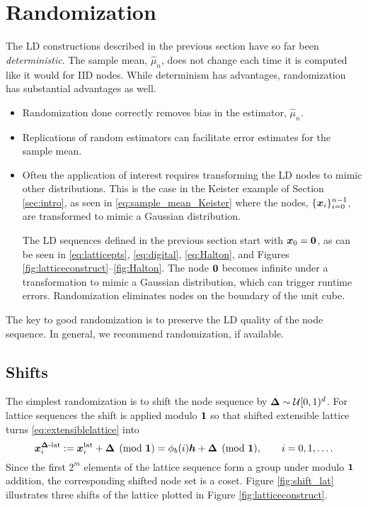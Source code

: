 \documentclass{svproc}
\begin{document}
\section{Randomization} \label{sec:random}
The LD constructions described in the previous section have so far been \emph{deterministic}. The sample mean, $\hat{\mu}_n$, does not change each time it is computed like it would for IID nodes. While determinism has advantages, randomization has substantial advantages as well.
\begin{itemize}
	\item Randomization done correctly removes bias in the estimator, $\hat{\mu}_n$.
	\item Replications of random estimators can facilitate error estimates for the sample mean.
	\item Often the application of interest requires transforming the LD nodes to mimic other distributions.  This is the case in the Keister example of Section \ref{sec:intro}, as seen in \eqref{eq:sample_mean_Keister} where the nodes, $\{{\boldsymbol{x}}_i\}_{i=0}^{n-1}$, are transformed to mimic a Gaussian distribution.

	The LD sequences defined in the previous section start with ${\boldsymbol{x}}_0 = {\boldsymbol{0}}$, as can be seen in \eqref{eq:latticepts}, \eqref{eq:digital}, \eqref{eq:Halton}, and Figures \ref{fig:latticeconstruct}--\ref{fig:Halton}.  The node ${\boldsymbol{0}}$ becomes infinite under a transformation to mimic a Gaussian distribution, which can trigger runtime errors.  Randomization eliminates nodes on the boundary of the unit cube.
\end{itemize}
The key to good randomization is to preserve the LD quality of the node sequence.  In general, we recommend randomization, if available.

\subsection{Shifts} \label{sec:shifts}
The simplest randomization is to shift the node sequence by ${\boldsymbol{\Delta}}  \sim {\mathcal{U}}[0,1)^d$.  For lattice  sequences the shift is applied modulo ${\boldsymbol{1}}$ so that shifted extensible lattice turns
\eqref{eq:extensiblelattice} into
\begin{equation} \label{eq:sh_extensiblelattice}
	{\boldsymbol{x}}^{{\boldsymbol{\Delta}}\text{-lat}}_i := {\boldsymbol{x}}_i^{\text{lat}} + {\boldsymbol{\Delta}} \pmod {{\boldsymbol{1}}} =\phi_b( i){\boldsymbol{h}} + {\boldsymbol{\Delta}} \pmod {{\boldsymbol{1}}}, \qquad i = 0, 1 , \ldots.
\end{equation}
Since the first $2^m$ elements of the lattice sequence form a group under modulo ${\boldsymbol{1}}$ addition, the corresponding shifted node set is a coset.  Figure \ref{fig:shift_lat} illustrates three shifts of the lattice plotted in Figure \ref{fig:latticeconstruct}.
\end{document}
